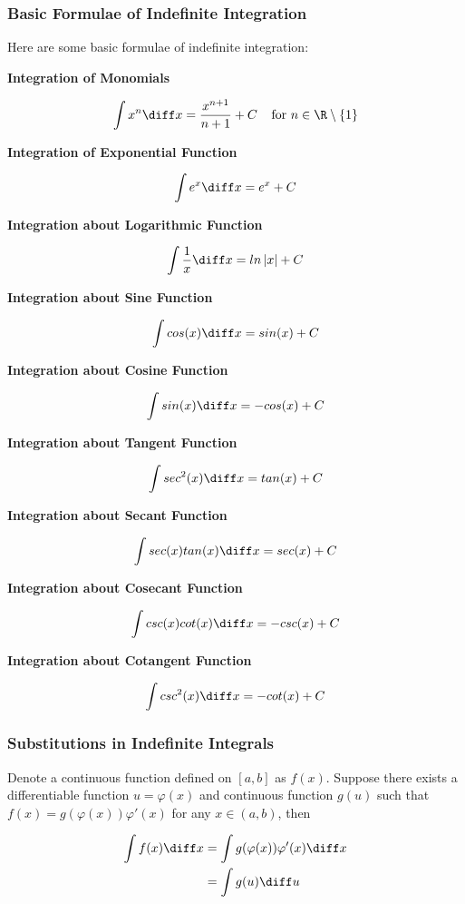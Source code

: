 \subsubsection{Basic Formulae of Indefinite Integration}
\begin{thm}
  Here are some basic formulae of indefinite integration:

  \begin{alist}
    \item \textbf{Integration of Monomials}

    $$\int x^{n}\diff x=\frac{x^{n+1}}{n+1}+C\;\;\;\;\text{for }n\in\R\setminus\left\{ 1\right\}$$

    \item \textbf{Integration of Exponential Function}

    $$\int e^{x}\diff x=e^{x}+C$$

    \item \textbf{Integration about Logarithmic Function}

    $$\int\frac{1}{x}\diff x=ln\left| x\right| +C$$

    \item \textbf{Integration about Sine Function}

    $$\int cos(x)\diff x=sin(x)+C$$

    \item \textbf{Integration about Cosine Function}

    $$\int sin(x)\diff x=-cos(x)+C$$

    \item \textbf{Integration about Tangent Function}

    $$\int sec^{2}(x)\diff x=tan(x)+C$$

    \item \textbf{Integration about Secant Function}

    $$\int sec(x)tan(x)\diff x=sec(x)+C$$

    \item \textbf{Integration about Cosecant Function}

    $$\int csc(x)cot(x)\diff x=-csc(x)+C$$

    \item \textbf{Integration about Cotangent Function}

    $$\int csc^{2}(x)\diff x=-cot(x)+C$$
  \end{alist}
\end{thm}

\subsubsection{Substitutions in Indefinite Integrals}
\begin{thm}
  Denote a continuous function defined on $[a,b]$ as $f(x)$. Suppose there exists a differentiable function $u=\varphi(x)$ and continuous function $g(u)$ such that $f(x)=g(\varphi(x))\varphi'(x)$ for any $x\in(a,b)$, then

  $$\begin{aligned}[t]
    \int f(x)\diff x&=\int g(\varphi(x))\varphi'(x)\diff x\\
    &=\int g(u)\diff u
  \end{aligned}$$
\end{thm}

